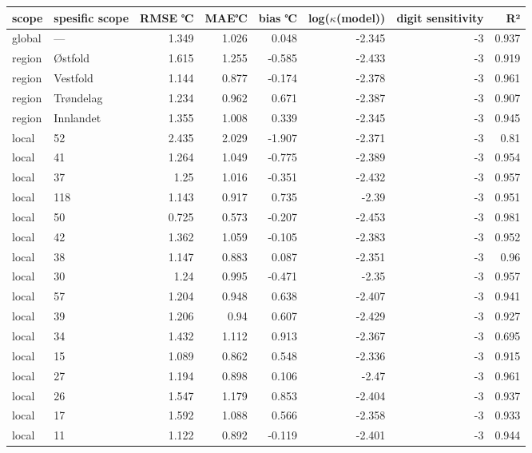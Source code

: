 \begin{tabular}{llrrrrrr}
\hline
 scope   & spesific
scope           &       RMSE
℃ &   MAE℃ &        bias
℃ &   log($\kappa$(model)) &    digit
sensitivity &    R² \\
\hline
 global  & ---       & 1.349 &  1.026 &  0.048 &                 -2.345 & -3 & 0.937 \\
 region  & Østfold   & 1.615 &  1.255 & -0.585 &                 -2.433 & -3 & 0.919 \\
 region  & Vestfold  & 1.144 &  0.877 & -0.174 &                 -2.378 & -3 & 0.961 \\
 region  & Trøndelag & 1.234 &  0.962 &  0.671 &                 -2.387 & -3 & 0.907 \\
 region  & Innlandet & 1.355 &  1.008 &  0.339 &                 -2.345 & -3 & 0.945 \\
 local   & 52        & 2.435 &  2.029 & -1.907 &                 -2.371 & -3 & 0.81  \\
 local   & 41        & 1.264 &  1.049 & -0.775 &                 -2.389 & -3 & 0.954 \\
 local   & 37        & 1.25  &  1.016 & -0.351 &                 -2.432 & -3 & 0.957 \\
 local   & 118       & 1.143 &  0.917 &  0.735 &                 -2.39  & -3 & 0.951 \\
 local   & 50        & 0.725 &  0.573 & -0.207 &                 -2.453 & -3 & 0.981 \\
 local   & 42        & 1.362 &  1.059 & -0.105 &                 -2.383 & -3 & 0.952 \\
 local   & 38        & 1.147 &  0.883 &  0.087 &                 -2.351 & -3 & 0.96  \\
 local   & 30        & 1.24  &  0.995 & -0.471 &                 -2.35  & -3 & 0.957 \\
 local   & 57        & 1.204 &  0.948 &  0.638 &                 -2.407 & -3 & 0.941 \\
 local   & 39        & 1.206 &  0.94  &  0.607 &                 -2.429 & -3 & 0.927 \\
 local   & 34        & 1.432 &  1.112 &  0.913 &                 -2.367 & -3 & 0.695 \\
 local   & 15        & 1.089 &  0.862 &  0.548 &                 -2.336 & -3 & 0.915 \\
 local   & 27        & 1.194 &  0.898 &  0.106 &                 -2.47  & -3 & 0.961 \\
 local   & 26        & 1.547 &  1.179 &  0.853 &                 -2.404 & -3 & 0.937 \\
 local   & 17        & 1.592 &  1.088 &  0.566 &                 -2.358 & -3 & 0.933 \\
 local   & 11        & 1.122 &  0.892 & -0.119 &                 -2.401 & -3 & 0.944 \\
\hline
\end{tabular}
